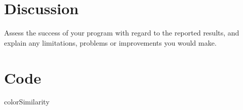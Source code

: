\documentclass{report}
\begin{document}
\chapter{Discussion}                
Assess the success of your program with regard to the reported results, and explain any limitations, problems or improvements you would make.

\chapter{Code}
colorSimilarity

\end{document}
